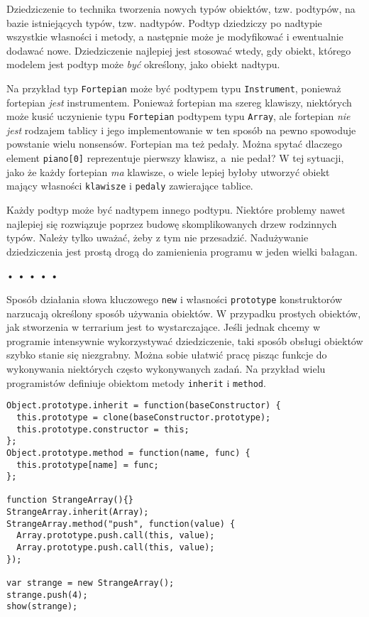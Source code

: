   
Dziedziczenie to technika tworzenia nowych typów obiektów, tzw. podtypów, na bazie istniejących typów, tzw. nadtypów. Podtyp dziedziczy po nadtypie wszystkie własności i metody, a następnie może je modyfikować i ewentualnie dodawać nowe. Dziedziczenie najlepiej jest stosować wtedy, gdy obiekt, którego modelem jest podtyp może \emph{być} określony, jako obiekt nadtypu.

  
Na przykład typ \texttt{Fortepian} może być podtypem typu \texttt{Instrument}, ponieważ fortepian \emph{jest} instrumentem. Ponieważ fortepian ma szereg klawiszy, niektórych może kusić uczynienie typu \texttt{Fortepian} podtypem typu \texttt{Array}, ale fortepian \emph{nie jest} rodzajem tablicy i jego implementowanie w ten sposób na pewno spowoduje powstanie wielu nonsensów. Fortepian ma też pedały. Można spytać dlaczego element \texttt{piano[0]} reprezentuje pierwszy klawisz, a~nie pedał? W tej sytuacji, jako że każdy fortepian \emph{ma} klawisze, o wiele lepiej byłoby utworzyć obiekt mający własności \texttt{klawisze} i \texttt{pedaly} zawierające tablice.

  
Każdy podtyp może być nadtypem innego podtypu. Niektóre problemy nawet najlepiej się rozwiązuje poprzez budowę skomplikowanych drzew rodzinnych typów. Należy tylko uważać, żeby z tym nie przesadzić. Nadużywanie dziedziczenia jest prostą drogą do zamienienia programu w jeden wielki bałagan.



\begin{center}
• • • • •
\end{center}

  
Sposób działania słowa kluczowego \texttt{new} i własności \texttt{prototype} konstruktorów narzucają określony sposób używania obiektów. W przypadku prostych obiektów, jak stworzenia w terrarium jest to wystarczające. Jeśli jednak chcemy w programie intensywnie wykorzystywać dziedziczenie, taki sposób obsługi obiektów szybko stanie się niezgrabny. Można sobie ułatwić pracę pisząc funkcje do wykonywania niektórych często wykonywanych zadań. Na przykład wielu programistów definiuje obiektom metody \texttt{inherit} i \texttt{method}.

  
\begin{verbatim} 
Object.prototype.inherit = function(baseConstructor) {
  this.prototype = clone(baseConstructor.prototype);
  this.prototype.constructor = this;
};
Object.prototype.method = function(name, func) {
  this.prototype[name] = func;
};

function StrangeArray(){}
StrangeArray.inherit(Array);
StrangeArray.method("push", function(value) {
  Array.prototype.push.call(this, value);
  Array.prototype.push.call(this, value);
});

var strange = new StrangeArray();
strange.push(4);
show(strange);
 \end{verbatim}
  
